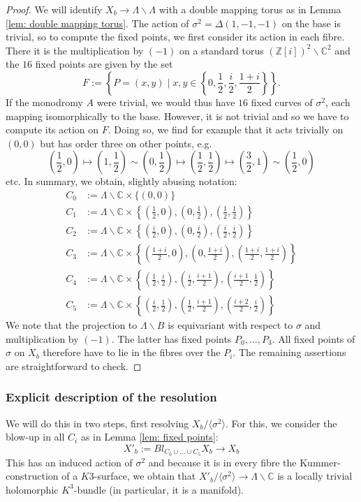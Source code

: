 \documentclass[12pt,reqno]{amsart}
\theoremstyle{definition}
\newcommand{\Z}{\mathbb{Z}}
\newcommand{\C}{\mathbb{C}}
\begin{document}
\begin{proof}
We will identify $X_b\to\Lambda\backslash\Lambda$ with a double mapping torus as in Lemma \ref{lem: double mapping torus}. The action of $\sigma^2=\Delta(1,-1,-1)$ on the base is trivial, so to compute the fixed points, we first consider its action in each fibre. There it is the multiplication by $(-1)$ on a standard torus $(\Z[i])^2\backslash\C^2$ and the $16$ fixed points are given by the set
\[
F:=\left\{P=(x,y)\mid x,y\in \left\{0,\frac 1 2,\frac i 2,\frac{1+i}{2}\right\}\right\}.
\]
If the monodromy $A$ were trivial, we would thus have $16$ fixed curves of $\sigma^2$, each mapping isomorphically to the base. However, it is not trivial and so we have to compute its action on $F$. Doing so, we find for example that it acts trivially on $(0,0)$ but has order three on other points, e.g. 
\[\left(\frac 1 2,0\right)\mapsto \left(1,\frac 12\right)\sim \left(0,\frac 12\right)\mapsto \left(\frac 12,\frac 12\right)\mapsto \left(\frac 3 2, 1\right)\sim\left(\frac 12,0\right)\]
etc. In summary, we obtain, slightly abusing notation:
\begin{align*}
C_0&:=\Lambda\backslash\C\times \{(0,0)\}\\
C_1&:=\Lambda\backslash\C\times \left\{\left(\frac 12,0\right),\left(0,\frac 12\right),\left(\frac 12,\frac 12\right)\right\}\\
C_2&:=\Lambda\backslash\C\times \left\{\left(\frac i2,0\right),\left(0,\frac i2\right),\left(\frac i2,\frac i2\right)\right\}\\
C_3&:=\Lambda\backslash\C\times\left\{\left(\frac {1+i} 2,0\right), \left(0,\frac{1+i} 2\right), \left(\frac {1+i} 2,\frac{1+i} 2\right)\right\}\\
C_4&:=\Lambda\backslash\C\times\left\{\left(\frac 12,\frac i2\right),\left(\frac i2,\frac{i+1}2\right), \left(\frac {i+1}2, \frac 12\right)\right\}\\
C_5&:=\Lambda\backslash\C\times\left\{\left(\frac i2,\frac 12\right), \left(\frac 12,\frac{i+1}2\right),\left(\frac{i+2}2,\frac i2\right)\right\}
\end{align*}
We note that the projection to $\Lambda\backslash B$ is equivariant with respect to $\sigma$ and multiplication by $(-1)$. The latter has fixed points $P_0,...,P_3$. All fixed points of $\sigma$ on $X_b$ therefore have to lie in the fibres over the $P_i$. The remaining assertions are straightforward to check.
\end{proof}



\subsubsection{Explicit description of the resolution} 
  We will do this in two steps, first resolving $X_b/\langle \sigma^2\rangle$. For this, we consider the blow-up in all $C_i$ as in Lemma \ref{lem: fixed points}:
\[
X'_b:=Bl_{C_0\cup...\cup C_5}X_b\longrightarrow X_b
\]
This has an induced action of $\sigma^2$ and because it is in every fibre the Kummer-construction of a $K3$-surface, we obtain that $X'_b/\langle \sigma^2\rangle\to \Lambda\backslash\C$ is a locally trivial holomorphic $K^3$-bundle (in particular, it is a manifold).
\end{document}
